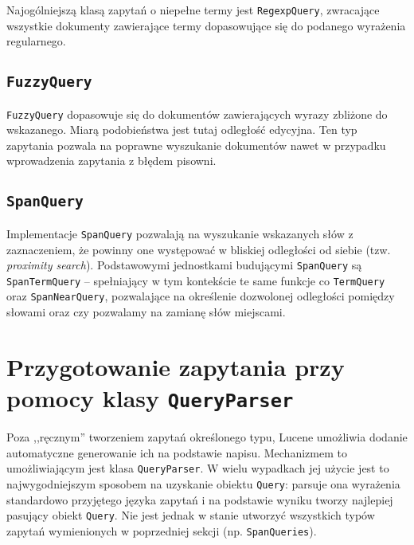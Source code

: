 Najogólniejszą klasą zapytań o niepełne termy jest \texttt{RegexpQuery}, zwracające wszystkie dokumenty zawierające termy dopasowujące się do podanego wyrażenia regularnego.

\subsection{\texttt{FuzzyQuery}}

\texttt{FuzzyQuery} dopasowuje się do dokumentów zawierających wyrazy zbliżone do wskazanego. Miarą podobieństwa jest tutaj odległość edycyjna. Ten typ zapytania pozwala na poprawne wyszukanie dokumentów nawet w przypadku wprowadzenia zapytania z błędem pisowni.

\subsection{\texttt{SpanQuery}}

Implementacje \texttt{SpanQuery} pozwalają na wyszukanie wskazanych słów z zaznaczeniem, że powinny one występować w bliskiej odległości od siebie (tzw. \emph{proximity search}). Podstawowymi jednostkami budującymi \texttt{SpanQuery} są \texttt{SpanTermQuery} -- spełniający w tym kontekście te same funkcje co \texttt{TermQuery} oraz \texttt{SpanNearQuery}, pozwalające na określenie dozwolonej odległości pomiędzy słowami oraz czy pozwalamy na zamianę słów miejscami.

\section{Przygotowanie zapytania przy pomocy klasy \texttt{QueryParser}}

Poza ,,ręcznym'' tworzeniem zapytań określonego typu, Lucene umożliwia dodanie automatyczne generowanie ich na podstawie napisu. Mechanizmem to umożliwiającym jest klasa \texttt{QueryParser}. W wielu wypadkach jej użycie jest to najwygodniejszym sposobem na uzyskanie obiektu \texttt{Query}: parsuje ona wyrażenia standardowo przyjętego języka zapytań i na podstawie wyniku tworzy najlepiej pasujący obiekt \texttt{Query}. Nie jest jednak w stanie utworzyć wszystkich typów zapytań wymienionych w poprzedniej sekcji (np. \texttt{SpanQueries}).
